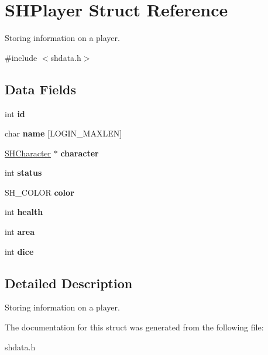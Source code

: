 \hypertarget{struct_s_h_player}{\section{S\-H\-Player Struct Reference}
\label{struct_s_h_player}
}


Storing information on a player.  




{\ttfamily \#include $<$shdata.\-h$>$}

\subsection*{Data Fields}
\begin{DoxyCompactItemize}
\item 
\hypertarget{struct_s_h_player_a7441ef0865bcb3db9b8064dd7375c1ea}{int {\bfseries id}}\label{struct_s_h_player_a7441ef0865bcb3db9b8064dd7375c1ea}

\item 
\hypertarget{struct_s_h_player_a94045f411f495adca84dfc992b868c86}{char {\bfseries name} \mbox{[}L\-O\-G\-I\-N\-\_\-\-M\-A\-X\-L\-E\-N\mbox{]}}\label{struct_s_h_player_a94045f411f495adca84dfc992b868c86}

\item 
\hypertarget{struct_s_h_player_ab5ab98edc8a9b2092f88183629daf0d8}{\hyperlink{struct_s_h_character}{S\-H\-Character} $\ast$ {\bfseries character}}\label{struct_s_h_player_ab5ab98edc8a9b2092f88183629daf0d8}

\item 
\hypertarget{struct_s_h_player_a6e27f49150e9a14580fb313cc2777e00}{int {\bfseries status}}\label{struct_s_h_player_a6e27f49150e9a14580fb313cc2777e00}

\item 
\hypertarget{struct_s_h_player_a9b7766f65f5bde580def592ba43184f1}{S\-H\-\_\-\-C\-O\-L\-O\-R {\bfseries color}}\label{struct_s_h_player_a9b7766f65f5bde580def592ba43184f1}

\item 
\hypertarget{struct_s_h_player_ae448fb16f537982185a0c5e8db56bdc6}{int {\bfseries health}}\label{struct_s_h_player_ae448fb16f537982185a0c5e8db56bdc6}

\item 
\hypertarget{struct_s_h_player_a5008f5aaa9ef50b1510e309dce9205d7}{int {\bfseries area}}\label{struct_s_h_player_a5008f5aaa9ef50b1510e309dce9205d7}

\item 
\hypertarget{struct_s_h_player_a3aa78241e5760eeb3b1bbc97b56f866e}{int {\bfseries dice}}\label{struct_s_h_player_a3aa78241e5760eeb3b1bbc97b56f866e}

\end{DoxyCompactItemize}


\subsection{Detailed Description}
Storing information on a player. 

The documentation for this struct was generated from the following file\-:\begin{DoxyCompactItemize}
\item 
shdata.\-h\end{DoxyCompactItemize}
